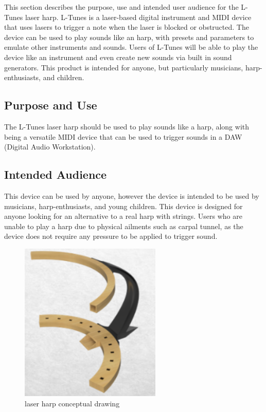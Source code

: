 This section describes the purpose, use and intended user audience for the L-Tunes laser harp. L-Tunes is a laser-based digital instrument and MIDI device that uses lasers to trigger a note when the laser is blocked or obstructed. The device can be used to play sounds like an harp, with presets and parameters to emulate other instruments and sounds. Users of L-Tunes will be able to play the device like an instrument and even create new sounds via built in sound generators. This product is intended for anyone, but particularly musicians, harp-enthusiasts, and children. 

\subsection{Purpose and Use}
The L-Tunes laser harp should be used to play sounds like a harp, along with being a versatile MIDI device that can be used to trigger sounds in a DAW (Digital Audio Workstation). 

\subsection{Intended Audience}
This device can be used by anyone, however the device is intended to be used by musicians, harp-enthusiasts, and young children. This device is designed for  anyone looking for an alternative to a real harp with strings. Users who are unable to play a harp due to physical ailments such as carpal tunnel, as the device does not require any pressure to be applied to trigger sound. 

\begin{figure}[h!]
	\centering
   	\includegraphics[width=0.60\textwidth]{images/ConceptualDrawing.png}
    \caption{laser harp conceptual drawing}
\end{figure}
